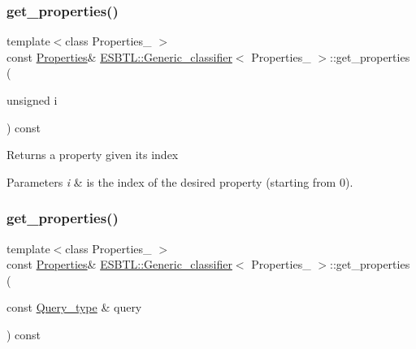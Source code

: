 \subsubsection{\texorpdfstring{get\+\_\+properties()}{get\_properties()}\hspace{0.1cm}{\footnotesize\ttfamily [1/2]}}
{\footnotesize\ttfamily template$<$class Properties\+\_\+ $>$ \\
const \hyperlink{structESBTL_1_1Generic__classifier_aef70ade88efad6f1819bfd389b925ac9}{Properties}\& \hyperlink{structESBTL_1_1Generic__classifier}{E\+S\+B\+T\+L\+::\+Generic\+\_\+classifier}$<$ Properties\+\_\+ $>$\+::get\+\_\+properties (\begin{DoxyParamCaption}\item[{unsigned}]{i }\end{DoxyParamCaption}) const\hspace{0.3cm}{\ttfamily [inline]}}

Returns a property given its index 
\begin{DoxyParams}{Parameters}
{\em i} & is the index of the desired property (starting from 0). \\
\hline
\end{DoxyParams}
\mbox{\label{structESBTL_1_1Generic__classifier_a8cf60fa688b352634428b688fe776ef8}} 
\subsubsection{\texorpdfstring{get\+\_\+properties()}{get\_properties()}\hspace{0.1cm}{\footnotesize\ttfamily [2/2]}}
{\footnotesize\ttfamily template$<$class Properties\+\_\+ $>$ \\
const \hyperlink{structESBTL_1_1Generic__classifier_aef70ade88efad6f1819bfd389b925ac9}{Properties}\& \hyperlink{structESBTL_1_1Generic__classifier}{E\+S\+B\+T\+L\+::\+Generic\+\_\+classifier}$<$ Properties\+\_\+ $>$\+::get\+\_\+properties (\begin{DoxyParamCaption}\item[{const \hyperlink{structESBTL_1_1Generic__classifier_af7772b010c028daaec09d6a3f556894d}{Query\+\_\+type} \&}]{query }\end{DoxyParamCaption}) const\hspace{0.3cm}{\ttfamily [inline]}}

